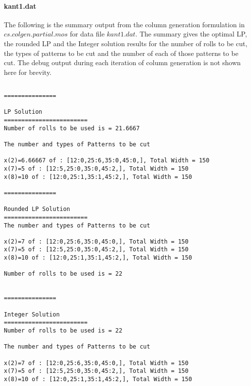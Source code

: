 \documentclass[twoside,12pt]{article}
\begin{document}
\paragraph{kant1.dat}
The following is the summary output from the column generation formulation in $ cs.colgen.partial.mos$ for data file $kant1.dat$. The summary gives the optimal LP, the rounded LP and the Integer solution results for the number of rolls to be cut, the types of patterns to be cut and the number of each of those patterns to be cut. The debug output during each iteration of column generation is not shown here for brevity.

\begin{verbatim}

===============

LP Solution
========================
Number of rolls to be used is = 21.6667

The number and types of Patterns to be cut

x(2)=6.66667 of : [12:0,25:6,35:0,45:0,], Total Width = 150
x(7)=5 of : [12:5,25:0,35:0,45:2,], Total Width = 150
x(8)=10 of : [12:0,25:1,35:1,45:2,], Total Width = 150

===============

Rounded LP Solution
========================
The number and types of Patterns to be cut

x(2)=7 of : [12:0,25:6,35:0,45:0,], Total Width = 150
x(7)=5 of : [12:5,25:0,35:0,45:2,], Total Width = 150
x(8)=10 of : [12:0,25:1,35:1,45:2,], Total Width = 150

Number of rolls to be used is = 22


===============

Integer Solution
========================
Number of rolls to be used is = 22

The number and types of Patterns to be cut

x(2)=7 of : [12:0,25:6,35:0,45:0,], Total Width = 150
x(7)=5 of : [12:5,25:0,35:0,45:2,], Total Width = 150
x(8)=10 of : [12:0,25:1,35:1,45:2,], Total Width = 150

\end{verbatim}
\end{document}
